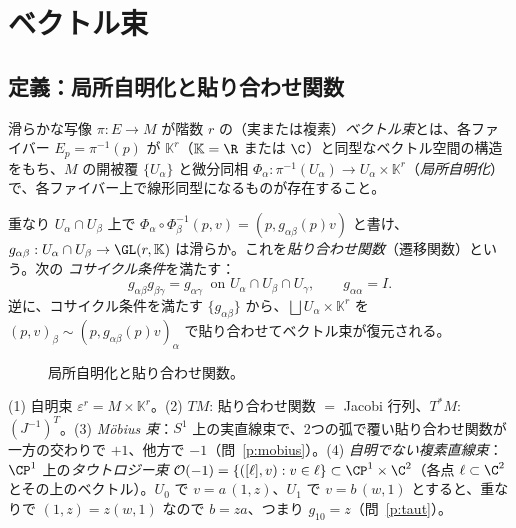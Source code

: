 
\section{ベクトル束}
\subsection{定義：局所自明化と貼り合わせ関数}
\begin{defn}[ベクトル束]
滑らかな写像 $\pi:E\to M$ が階数 $r$ の（実または複素）\emph{ベクトル束}とは、各ファイバー $E_p=\pi^{-1}(p)$ が $\mathbb K^r$（$\mathbb K=\R$ または $\C$）と同型なベクトル空間の構造をもち、$M$ の開被覆 $\{U_\alpha\}$ と微分同相 $\Phi_\alpha:\pi^{-1}(U_\alpha)\to U_\alpha\times\mathbb K^r$（\emph{局所自明化}）で、各ファイバー上で線形同型になるものが存在すること。
\end{defn}

重なり $U_\alpha\cap U_\beta$ 上で $\Phi_\alpha\circ\Phi_\beta^{-1}(p,v)=(p,g_{\alpha\beta}(p)v)$ と書け、$g_{\alpha\beta}:U_\alpha\cap U_\beta\to\GL(r,\mathbb K)$ は滑らか。これを\emph{貼り合わせ関数}（遷移関数）という。次の \emph{コサイクル条件}を満たす：
\begin{equation}\label{eq:cocycle}
g_{\alpha\beta}g_{\beta\gamma}=g_{\alpha\gamma}\ \text{ on }U_\alpha\cap U_\beta\cap U_\gamma,\qquad g_{\alpha\alpha}=I.
\end{equation}
逆に、コサイクル条件を満たす $\{g_{\alpha\beta}\}$ から、$\bigsqcup U_\alpha\times\mathbb K^r$ を $(p,v)_\beta\sim(p,g_{\alpha\beta}(p)v)_\alpha$ で貼り合わせてベクトル束が復元される。

\begin{figure}[h]
\centering
{}
\caption{局所自明化と貼り合わせ関数。}
\end{figure}

\begin{ex}\label{ex:bundles}
(1) 自明束 $\varepsilon^r=M\times\mathbb K^r$。(2) $TM$: 貼り合わせ関数 $=$ Jacobi 行列、$T^*M$: $(J^{-1})^T$。(3) \emph{Möbius 束}：$S^1$ 上の実直線束で、2つの弧で覆い貼り合わせ関数が一方の交わりで $+1$、他方で $-1$（問~\ref{p:mobius}）。(4) \emph{自明でない複素直線束}：$\CP^1$ 上の\emph{タウトロジー束} $\mathcal O(-1)=\{([\ell],v):v\in\ell\}\subset\CP^1\times\C^2$（各点 $\ell\subset\C^2$ とその上のベクトル）。$U_0$ で $v=a\,(1,z)$、$U_1$ で $v=b\,(w,1)$ とすると、重なりで $(1,z)=z(w,1)$ なので $b=za$、つまり $g_{10}=z$（問~\ref{p:taut}）。
\end{ex}

